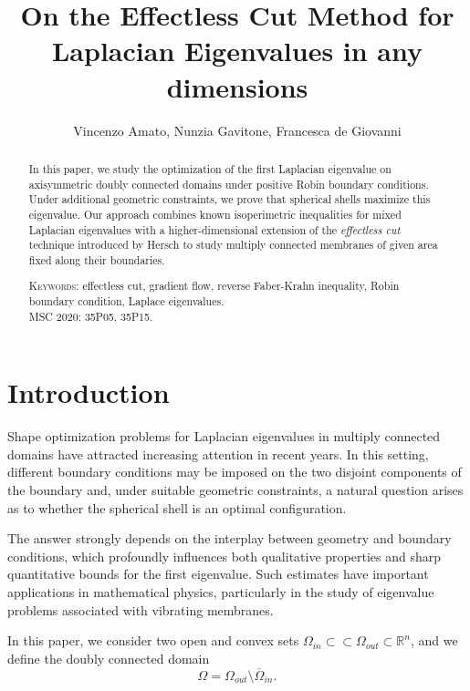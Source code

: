 \documentclass[oneside,a4paper,11pt,notitlepage]{article}
\title{On the Effectless Cut Method for Laplacian Eigenvalues in any dimensions}
\author{Vincenzo Amato, Nunzia Gavitone, Francesca de Giovanni}
\date{}
\theoremstyle{plain}
\numberwithin{teor}{section}
\numberwithin{equation}{section}
\theoremstyle{definition}
\theoremstyle{plain}
\theoremstyle{plain}
\theoremstyle{plain}
\theoremstyle{plain}
\theoremstyle{definition}
\theoremstyle{definition}
\theoremstyle{plain}
\begin{document}
\maketitle

   \begin{abstract}
In this paper, we study the optimization of the first Laplacian eigenvalue on axisymmetric doubly connected domains under positive Robin boundary conditions. Under additional geometric constraints, we prove that spherical shells maximize this eigenvalue. Our approach combines known isoperimetric inequalities for mixed Laplacian eigenvalues with a higher-dimensional extension of the \emph{effectless cut} technique introduced by Hersch to study multiply connected membranes of given area fixed along their boundaries.

\vspace{5pt}
\textsc{Keywords:} effectless cut, gradient flow, reverse Faber-Krahn inequality, Robin boundary condition, Laplace eigenvalues.\\
\textsc{MSC 2020: 35P05, 35P15.}  
\end{abstract}

\begin{center}
\begin{minipage}{10cm}
\small
\tableofcontents
\end{minipage}
\end{center}

\section{Introduction}

Shape optimization problems for Laplacian eigenvalues in multiply connected domains have attracted increasing attention in recent years. In this setting, different boundary conditions may be imposed on the two disjoint components of the boundary and, under suitable geometric constraints, a natural question arises as to whether the spherical shell is an optimal configuration.

The answer strongly depends on the interplay between geometry and boundary conditions, which profoundly influences both qualitative properties and sharp quantitative bounds for the first eigenvalue. Such estimates have important applications in mathematical physics, particularly in the study of eigenvalue problems associated with vibrating membranes.

In this paper, we consider two open and convex sets $\Omega_{in} \subset\subset \Omega_{out} \subset \mathbb{R}^n$, and we define the doubly connected domain
\[
\Omega = \Omega_{out} \setminus \overline{\Omega}_{in}.
\]
\end{document}
